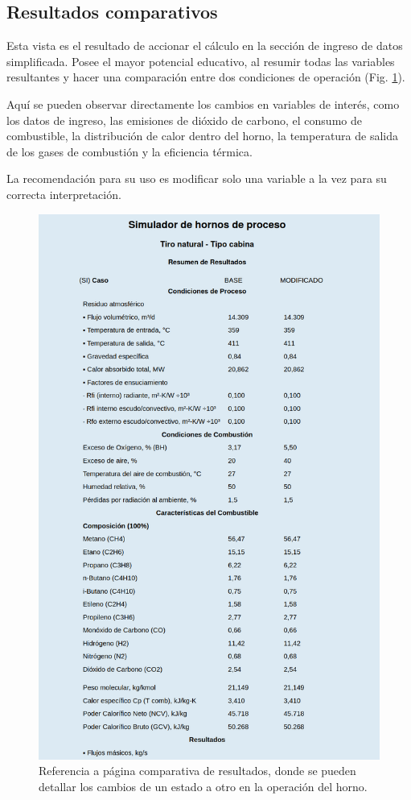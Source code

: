 \subsection{Resultados comparativos}
\par Esta vista es el resultado de accionar el cálculo en la sección de ingreso de datos simplificada. Posee el mayor potencial educativo, al resumir todas las variables resultantes y hacer una comparación entre dos condiciones de operación (Fig. \ref{fig:resultados}).
\par Aquí se pueden observar directamente los cambios en variables de interés, como los datos de ingreso, las emisiones de dióxido de carbono, el consumo de combustible, la distribución de calor dentro del horno, la temperatura de salida de los gases de combustión y la eficiencia térmica.
\par La recomendación para su uso es modificar solo una variable a la vez para su correcta interpretación.
\begin{figure}[H] \begin{center}
\includegraphics[scale=0.3]{images/result}
\caption[Página comparativa de resultados]
{Referencia a página comparativa de resultados, donde se pueden detallar los cambios de un estado a otro en la operación del horno.}
\label{fig:resultados} \end{center} \end{figure}


